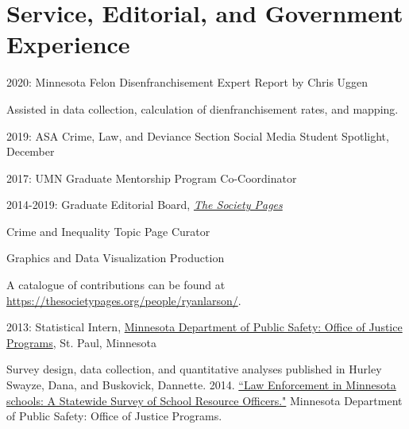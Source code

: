 \documentclass[letterpaper]{article}
\renewenvironment{itemize}{
  \begin{list}{}{
    \setlength{\leftmargin}{1.5em}
  }
}{
  \end{list}
}
\begin{document}
\section*{\textbf{Service, Editorial, and Government Experience}}
\begin{itemize}

\item 2020: Minnesota Felon Disenfranchisement Expert Report by Chris Uggen 
\begin{itemize}
	\item Assisted in data collection, calculation of dienfranchisement rates, and mapping. 
\end{itemize}

\item 2019: ASA Crime, Law, and Deviance Section Social Media Student Spotlight, December

\item 2017: UMN Graduate Mentorship Program Co-Coordinator

\item  2014-2019:  Graduate Editorial Board, \href{http://thesocietypages.org/}{\textit{The Society Pages}}
\begin{itemize}
\item Crime and Inequality Topic Page Curator
\item Graphics and Data Visualization Production
\item A catalogue of contributions can be found at \href{https://thesocietypages.org/people/ryanlarson/}{https://thesocietypages.org/people/ryanlarson/}.
\end{itemize}

\item 2013: Statistical Intern, \href{https://dps.mn.gov/divisions/ojp/statistical-analysis-center/Pages/default.aspx}{Minnesota Department of Public Safety: Office of Justice Programs}, St. Paul, Minnesota
\begin{itemize}
	\item Survey design, data collection, and quantitative analyses published in Hurley Swayze, Dana, and  Buskovick, Dannette. 2014. \href{https://dps.mn.gov/divisions/ojp/forms-documents/Documents/SRO20REPORT.pdf}{``Law Enforcement in Minnesota schools: A Statewide Survey of School Resource Officers."} Minnesota Department of Public Safety: Office of Justice Programs.
	\end{itemize}
\end{itemize}
\end{document}
